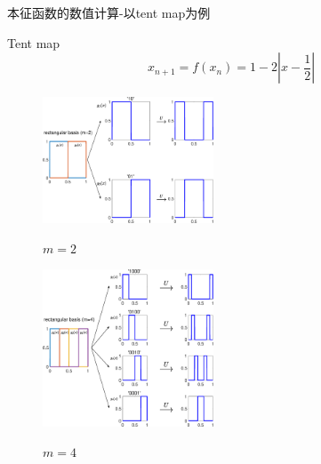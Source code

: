 \documentclass{beamer}
\begin{document}
	     \begin{frame}{本征函数的数值计算-以tent map为例}
	     	\begin{block}{Tent map}
	     		\begin{equation*}
	     		x_{n+1}=f(x_n)=1-2\left|x-\frac{1}{2}\right|
	     		\end{equation*}
	     	\end{block}
	     \begin{figure}
	     	\begin{minipage}{0.45\linewidth}
	     		\centerline{\includegraphics[width=2in]{images/01a-Tent_U2.eps}}
	     		\centerline{$m=2$}
	     	\end{minipage}
	     	\hfill
	     	\begin{minipage}{0.45\linewidth}
	     		\centerline{\includegraphics[width=2in]{images/01b-Tent_U4.eps}}
	     		\centerline{$m=4$}
	     	\end{minipage}
	     \end{figure}
	     \end{frame}
 
\end{document}
